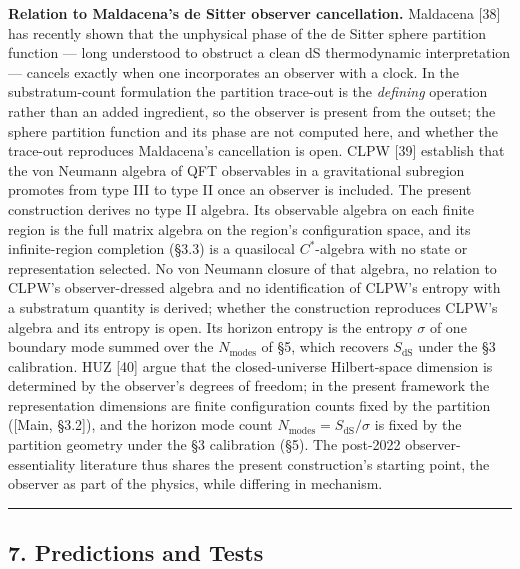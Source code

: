 \documentclass[
]{article}
\begin{document}
\textbf{Relation to Maldacena's de Sitter observer cancellation.}
Maldacena {[}38{]} has recently shown that the unphysical phase of the
de Sitter sphere partition function --- long understood to obstruct a
clean dS thermodynamic interpretation --- cancels exactly when one
incorporates an observer with a clock. In the substratum-count
formulation the partition trace-out is the \emph{defining} operation
rather than an added ingredient, so the observer is present from the
outset; the sphere partition function and its phase are not computed
here, and whether the trace-out reproduces Maldacena's cancellation is
open. CLPW {[}39{]} establish that the von Neumann algebra of QFT
observables in a gravitational subregion promotes from type III to type
II once an observer is included. The present construction derives no
type II algebra. Its observable algebra on each finite region is the
full matrix algebra on the region's configuration space, and its
infinite-region completion (§3.3) is a quasilocal \(C^{*}\)-algebra with
no state or representation selected. No von Neumann closure of that
algebra, no relation to CLPW's observer-dressed algebra and no
identification of CLPW's entropy with a substratum quantity is derived;
whether the construction reproduces CLPW's algebra and its entropy is
open. Its horizon entropy is the entropy \(\sigma\) of one boundary mode
summed over the \(N_{\text{modes}}\) of §5, which recovers
\(S_{\text{dS}}\) under the §3 calibration. HUZ {[}40{]} argue that the
closed-universe Hilbert-space dimension is determined by the observer's
degrees of freedom; in the present framework the representation
dimensions are finite configuration counts fixed by the partition
({[}Main, §3.2{]}), and the horizon mode count
\(N_{\text{modes}} = S_{\text{dS}}/\sigma\) is fixed by the partition
geometry under the §3 calibration (§5). The post-2022
observer-essentiality literature thus shares the present construction's
starting point, the observer as part of the physics, while differing in
mechanism.

\begin{center}\rule{0.5\linewidth}{0.5pt}\end{center}

\hypertarget{predictions-and-tests}{%
\subsection{7. Predictions and Tests}\label{predictions-and-tests}}
\end{document}
